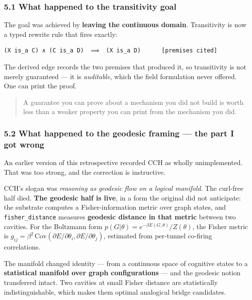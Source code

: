 \documentclass[
  11pt,
  a4paper,
]{article}
\begin{document}
\subsubsection{5.1 What happened to the transitivity
goal}\label{what-happened-to-the-transitivity-goal}

The goal was achieved by \textbf{leaving the continuous domain}.
Transitivity is now a typed rewrite rule that fires exactly:

\begin{verbatim}
(X is_a C) ∧ (C is_a D)  ⟹  (X is_a D)      [premises cited]
\end{verbatim}

The derived edge records the two premises that produced it, so
transitivity is not merely guaranteed --- it is \emph{auditable}, which
the field formulation never offered. One can print the proof.

\begin{quote}
A guarantee you can prove about a mechanism you did not build is worth
less than a weaker property you can print from the mechanism you did.
\end{quote}

\subsubsection{5.2 What happened to the geodesic framing --- the part I
got
wrong}\label{what-happened-to-the-geodesic-framing-the-part-i-got-wrong}

An earlier version of this retrospective recorded CCH as wholly
unimplemented. That was too strong, and the correction is instructive.

CCH's slogan was \emph{reasoning as geodesic flow on a logical
manifold}. The curl-free half died. \textbf{The geodesic half is live},
in a form the original did not anticipate: the substrate computes a
Fisher-information metric over graph states, and
\texttt{fisher\_distance} measures \textbf{geodesic distance in that
metric} between two cavities. For the Boltzmann form
\(p(G|\theta) = e^{-\beta E(G,\theta)}/Z(\theta)\), the Fisher metric is
\(g_{ij} = \beta^2\,\mathrm{Cov}(\partial E/\partial\theta_i,
\partial E/\partial\theta_j)\), estimated from per-tunnel co-firing
correlations.

The manifold changed identity --- from a continuous space of cognitive
states to a \textbf{statistical manifold over graph configurations} ---
and the geodesic notion transferred intact. Two cavities at small Fisher
distance are statistically indistinguishable, which makes them optimal
analogical bridge candidates.
\end{document}
